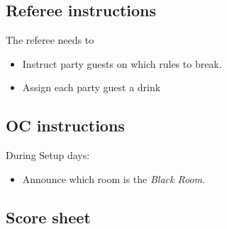 \subsection*{Referee instructions}

The referee needs to
\begin{itemize}
	\item Instruct party guests on which rules to break.
	\item Assign each party guest a drink
\end{itemize}

\subsection*{OC instructions}
During Setup days:
\begin{itemize}
	\item Announce which room is the \textit{Black Room}.
\end{itemize}

\subsection*{Score sheet}



